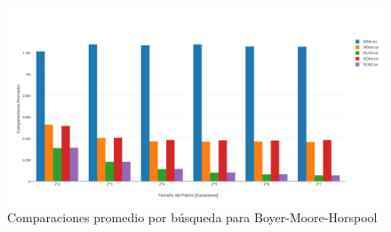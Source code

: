 \documentclass[14pt,letterpaper,hidelinks]{extarticle}
\begin{document}
		\newpage
		\begin{figure}[ht!]
			\centering
			\includegraphics[scale=0.5]{img/cBMH.pdf}
			\caption{Comparaciones promedio por búsqueda para Boyer-Moore-Horspool} \label{construccion}
		\end{figure}


\newpage
\end{document}
